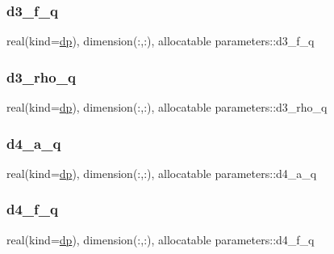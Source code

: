 \subsubsection{\texorpdfstring{d3\+\_\+f\+\_\+q}{d3\_f\_q}}
{\footnotesize\ttfamily real(kind=\mbox{\hyperlink{namespaceparameters_a52f8c6351fd79345d8811e065bcbbb37}{dp}}), dimension(\+:,\+:), allocatable parameters\+::d3\+\_\+f\+\_\+q}

\mbox{\label{namespaceparameters_a1621c80d10f0cca4fec0e20ffbdda0f5}} 
\subsubsection{\texorpdfstring{d3\+\_\+rho\+\_\+q}{d3\_rho\_q}}
{\footnotesize\ttfamily real(kind=\mbox{\hyperlink{namespaceparameters_a52f8c6351fd79345d8811e065bcbbb37}{dp}}), dimension(\+:,\+:), allocatable parameters\+::d3\+\_\+rho\+\_\+q}

\mbox{\label{namespaceparameters_a68e56fd9914d22072aed5a180c5a17b2}} 
\subsubsection{\texorpdfstring{d4\+\_\+a\+\_\+q}{d4\_a\_q}}
{\footnotesize\ttfamily real(kind=\mbox{\hyperlink{namespaceparameters_a52f8c6351fd79345d8811e065bcbbb37}{dp}}), dimension(\+:,\+:), allocatable parameters\+::d4\+\_\+a\+\_\+q}

\mbox{\label{namespaceparameters_af226839e94cc06ff5d33f92af38a014c}} 
\subsubsection{\texorpdfstring{d4\+\_\+f\+\_\+q}{d4\_f\_q}}
{\footnotesize\ttfamily real(kind=\mbox{\hyperlink{namespaceparameters_a52f8c6351fd79345d8811e065bcbbb37}{dp}}), dimension(\+:,\+:), allocatable parameters\+::d4\+\_\+f\+\_\+q}

\mbox{\label{namespaceparameters_a59deaa51eaa68f574d57f364fff6c77a}} 
